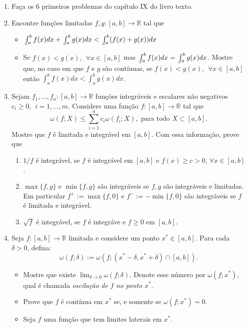 \documentclass{article}
\theoremstyle{plain}
\theoremstyle{definition}
\theoremstyle{remark}
\newcommand{\R}{{\mathbb R}}
\def\lowint{\mkern3mu\underline{\vphantom{\intop}\mkern7mu}\mkern-10mu\int}
\begin{document}
\begin{enumerate}
  \item Faça os 6 primeiros problemas do capítulo IX do livro texto. 
  \item Encontre funções limitadas $f,g:[a,b] \rightarrow \mathbb{R}$
  tal que
   \begin{itemize}
   \item $\lowint_{a}^{b} f(x)dx +\lowint_{a}^{b} g(x)dx< \lowint_{a}^{b} (f(x)+g(x))dx$
   \item Se $f(x)<g(x), \ \  \forall x \in [a,b]$ mas 
  $\lowint_{a}^{b} f(x)dx= \lowint_{a}^{b} g(x)dx$. 
  Mostre que, no caso em que $f$ e $g$ são contínuas, se 
  $f(x)<g(x), \ \  \forall x \in [a,b]$ então 
  $\int_{a}^{b} f(x)dx < \int_{a}^{b} g(x)dx$. 
   \end{itemize}
 \item 
  Sejam $f_{1}, \dots, f_{n}:[a,b]\rightarrow \R$ funções integráveis e 
  escalares não negativos $c_{i}\geq0, \ \ i=1, \dots, m$.
  Considere uma função $f:[a, b] \rightarrow \R$ 
  tal que $$\omega(f;X) \leq \sum_{i=1}^{n} c_{i}\omega(f_i;X), \text { para todo } X \subset [a,b].$$ 
  Mostre que $f$ é limitada e integrável em $[a,b]$. Com essa informação, 
  prove que 
  \begin{enumerate}
   \item $1/f$ é integrável, se $f$ é integrável em $[a,b]$ e 
   $f(x)\geq c>0$, $\forall x \in [a,b]$.
   \item $\max\{f,g\}$ e $\min\{f,g\}$ são integráveis se $f,g$ são integráveis e limitadas. Em particular $f^{+}:=\max\{f, 0\}$ e $f^{-}:=-\min\{f, 0\}$ são integráveis se $f$ é limitada e integrável.   
   \item $\sqrt{f}$ é integrável, se $f$ é integráve e 
   $f\geq0$ em $[a,b]$.
   \end{enumerate}
 \item Seja $f:[a,b]\rightarrow \R$ limitada e considere um ponto 
 $x^{*} \in [a,b]$. Para cada $\delta>0$, defina:
 $$ \omega(f; \delta):= \omega(f; (x^{*}-\delta, x^{*}+\delta)\cap [a,b]).$$
  \begin{itemize}
  \item Mostre que existe $\lim_{\delta \rightarrow 0} \omega(f;\delta)$.
  Denote esse número por $\omega(f;x ^*)$, qual é chamada {\it oscilação de $f$ no ponto $x^*$}. 
  \item Prove que $f$ é contínua em $x^{*}$ se, e somente se $\omega(f;x^*)=0$.
  \item Seja $f$ uma função que tem limites laterais em $x^*$. 

\end{itemize}
\end{enumerate}
\end{document}
